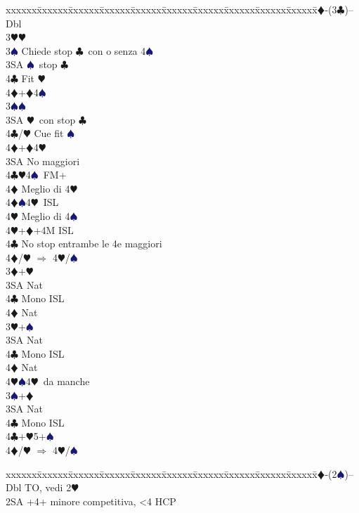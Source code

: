 \documentclass[a4paper,italian]{article}
\newcommand{\BC}{\textcolor{OliveGreen}{$\clubsuit$}}
\newcommand{\BD}{\textcolor{RedOrange}{$\vardiamondsuit$}}
\newcommand{\BH}{\textcolor{Red2}{$\varheartsuit${}}}
\newcommand{\BS}{\textcolor{MidnightBlue}{$\spadesuit${}}}
\newenvironment{bidtable}
{\begin{tabbing}

    xxxxxx\=xxxxxx\=xxxxxx\=xxxxxx\=xxxxxx\=xxxxxx\=xxxxxx\=xxxxxx\=xxxxxx\=xxxxxx\=\kill}
{\end{tabbing} }%
\begin{document}
\begin{multicols}{2}
\begin{bidtable}
        2\BD-(3\BC)--\+\\
        Dbl\+\\
        3\BH {}\BH \+\\
        3\BS \> Chiede stop \BC\ con o senza 4\BS \\
        3SA \BS\ stop \BC\\
        4\BC \> Fit \BH \\
        4\BD {}+\BD 4\BS \-\\
        3\BS {}\BS \+\\
        3SA \BH\ con stop \BC \\
        4\BC/\BH \> Cue fit \BS \\
        4\BD {}+\BD 4\BH \-\\
        3SA \> No maggiori\+\\
        4\BC {}\BH 4\BS\ FM+\+\\
        4\BD \> Meglio di 4\BH \-\\
        4\BD {}\BS 4\BH\ ISL\+\\
        4\BH \> Meglio di 4\BS \-\\
        4\BH {}+\BD +4M ISL\-\\
        4\BC\> No stop entrambe le 4e maggiori\+\\
        4\BD/\BH\> $\Rightarrow$ 4\BH/\BS\-\\
        3\BD {}+\BH \+\\
        3SA \> Nat\+\\
        4\BC \> Mono ISL\\
        4\BD \> Nat\-\-\\
        3\BH {}+\BS \+\\
        3SA \> Nat\+\\
        4\BC \> Mono ISL\\
        4\BD \> Nat\\
        4\BH {}\BS 4\BH\ da manche\-\-\\
        3\BS {}+\BD \+\\
        3SA \> Nat\+\\
        4\BC \> Mono ISL\-\-\\
        4\BC {}+\BH5+\BS\\
        4\BD/\BH \> $\Rightarrow$ 4\BH /\BS \-
    \end{bidtable}
    \begin{bidtable}
        2\BD-(2\BS)--\+\\
        Dbl \> TO, vedi 2\BH \\
        2SA +4+ minore competitiva, <4 HCP\\

\end{bidtable}
\end{multicols}
\end{document}
